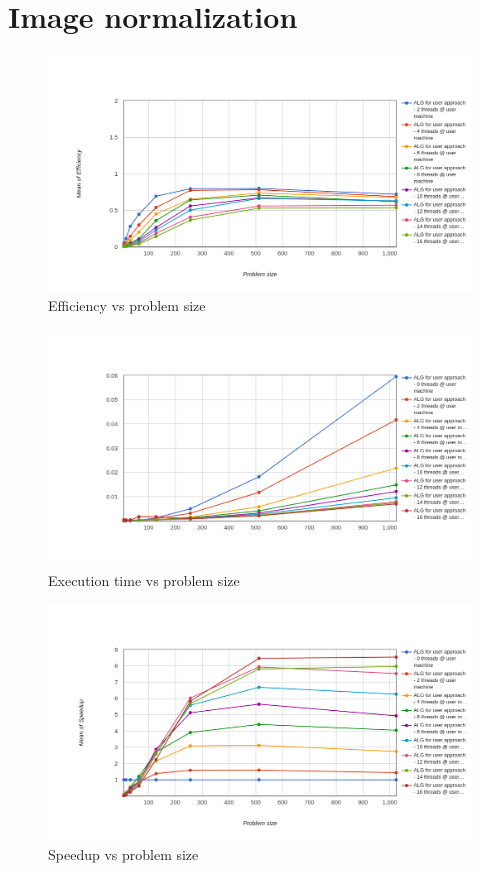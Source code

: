 \documentclass[runningheads, a4paper, oribibl]{llncs}
\begin{document}
\section{Image normalization}
\begin{figure}[h!]
    \centering
    \includegraphics[scale = 0.3]{q3/mean_efficiency.png}
    \caption{Efficiency vs problem size}
    \label{fig:q3_eff}
\end{figure}

\begin{figure}[h!]
    \centering
    \includegraphics[scale = 0.3]{q3/mean_executionTime.png}
    \caption{Execution time vs problem size}
    \label{fig:q3_time}
\end{figure}

\begin{figure}[h!]
    \centering
    \includegraphics[scale = 0.3]{q3/mean_speedup.png}
    \caption{Speedup vs problem size}
    \label{fig:q3_speedup}
\end{figure}
\end{document}
